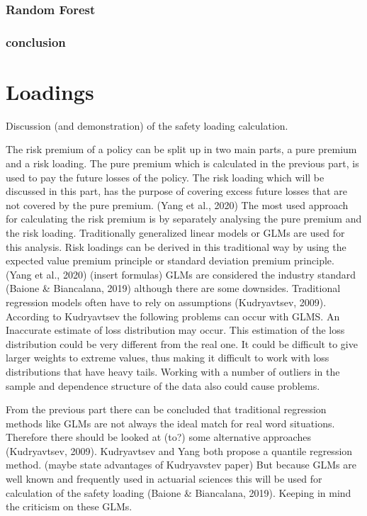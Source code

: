 \documentclass[
  12pt,
]{article}
\begin{document}
\hypertarget{random-forest}{%
\subsubsection{Random Forest}\label{random-forest}}

\hypertarget{conclusion-1}{%
\subsubsection{conclusion}\label{conclusion-1}}

\hypertarget{loadings}{%
\section{Loadings}\label{loadings}}

Discussion (and demonstration) of the safety loading calculation.

The risk premium of a policy can be split up in two main parts, a pure
premium and a risk loading. The pure premium which is calculated in the
previous part, is used to pay the future losses of the policy. The risk
loading which will be discussed in this part, has the purpose of
covering excess future losses that are not covered by the pure premium.
(Yang et al., 2020) The most used approach for calculating the risk
premium is by separately analysing the pure premium and the risk
loading. Traditionally generalized linear models or GLMs are used for
this analysis. Risk loadings can be derived in this traditional way by
using the expected value premium principle or standard deviation premium
principle. (Yang et al., 2020) (insert formulas) GLMs are considered the
industry standard (Baione \& Biancalana, 2019) although there are some
downsides. Traditional regression models often have to rely on
assumptions (Kudryavtsev, 2009). According to Kudryavtsev the following
problems can occur with GLMS. An Inaccurate estimate of loss
distribution may occur. This estimation of the loss distribution could
be very different from the real one. It could be difficult to give
larger weights to extreme values, thus making it difficult to work with
loss distributions that have heavy tails. Working with a number of
outliers in the sample and dependence structure of the data also could
cause problems.

From the previous part there can be concluded that traditional
regression methods like GLMs are not always the ideal match for real
word situations. Therefore there should be looked at (to?) some
alternative approaches (Kudryavtsev, 2009). Kudryavtsev and Yang both
propose a quantile regression method. (maybe state advantages of
Kudryavstev paper) But because GLMs are well known and frequently used
in actuarial sciences this will be used for calculation of the safety
loading (Baione \& Biancalana, 2019). Keeping in mind the criticism on
these GLMs.

\renewcommand\refname{Appendix}
  
\end{document}
